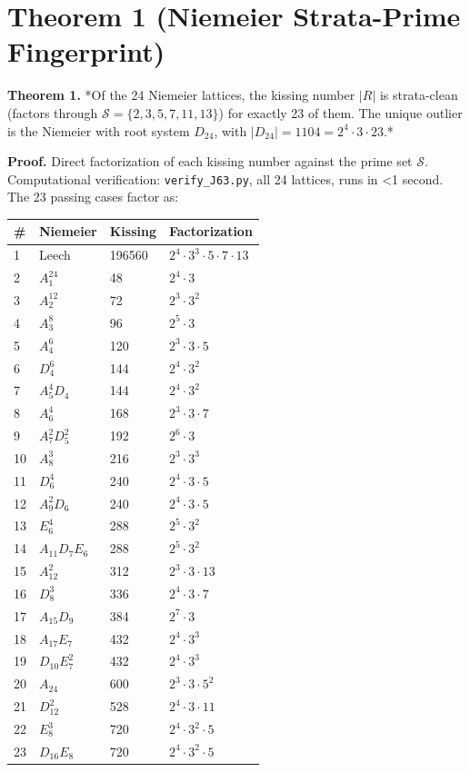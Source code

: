 \documentclass[11pt,reqno]{amsart}
\theoremstyle{plain}
\theoremstyle{definition}
\begin{document}
\section{Theorem 1 (Niemeier Strata-Prime Fingerprint)}

\textbf{Theorem 1.} *Of the 24 Niemeier lattices, the kissing number $|R|$ is strata-clean (factors through $\mathcal{S} = \{2,3,5,7,11,13\}$) for exactly 23 of them. The unique outlier is the Niemeier with root system $D_{24}$, with $|D_{24}| = 1104 = 2^4 \cdot 3 \cdot 23$.*

\textbf{Proof.} Direct factorization of each kissing number against the prime set $\mathcal{S}$. Computational verification: \texttt{verify_J63.py}, all 24 lattices, runs in <1 second. The 23 passing cases factor as:

\begin{center}
\begin{tabular}{llll}
\toprule
# & Niemeier & Kissing & Factorization \\
\midrule
1 & Leech & 196560 & $2^4 \cdot 3^3 \cdot 5 \cdot 7 \cdot 13$ \\
2 & $A_1^{24}$ & 48 & $2^4 \cdot 3$ \\
3 & $A_2^{12}$ & 72 & $2^3 \cdot 3^2$ \\
4 & $A_3^8$ & 96 & $2^5 \cdot 3$ \\
5 & $A_4^6$ & 120 & $2^3 \cdot 3 \cdot 5$ \\
6 & $D_4^6$ & 144 & $2^4 \cdot 3^2$ \\
7 & $A_5^4 D_4$ & 144 & $2^4 \cdot 3^2$ \\
8 & $A_6^4$ & 168 & $2^3 \cdot 3 \cdot 7$ \\
9 & $A_7^2 D_5^2$ & 192 & $2^6 \cdot 3$ \\
10 & $A_8^3$ & 216 & $2^3 \cdot 3^3$ \\
11 & $D_6^4$ & 240 & $2^4 \cdot 3 \cdot 5$ \\
12 & $A_9^2 D_6$ & 240 & $2^4 \cdot 3 \cdot 5$ \\
13 & $E_6^4$ & 288 & $2^5 \cdot 3^2$ \\
14 & $A_{11} D_7 E_6$ & 288 & $2^5 \cdot 3^2$ \\
15 & $A_{12}^2$ & 312 & $2^3 \cdot 3 \cdot 13$ \\
16 & $D_8^3$ & 336 & $2^4 \cdot 3 \cdot 7$ \\
17 & $A_{15} D_9$ & 384 & $2^7 \cdot 3$ \\
18 & $A_{17} E_7$ & 432 & $2^4 \cdot 3^3$ \\
19 & $D_{10} E_7^2$ & 432 & $2^4 \cdot 3^3$ \\
20 & $A_{24}$ & 600 & $2^3 \cdot 3 \cdot 5^2$ \\
21 & $D_{12}^2$ & 528 & $2^4 \cdot 3 \cdot 11$ \\
22 & $E_8^3$ & 720 & $2^4 \cdot 3^2 \cdot 5$ \\
23 & $D_{16} E_8$ & 720 & $2^4 \cdot 3^2 \cdot 5$ \\
\bottomrule
\end{tabular}
\end{center}
\end{document}
